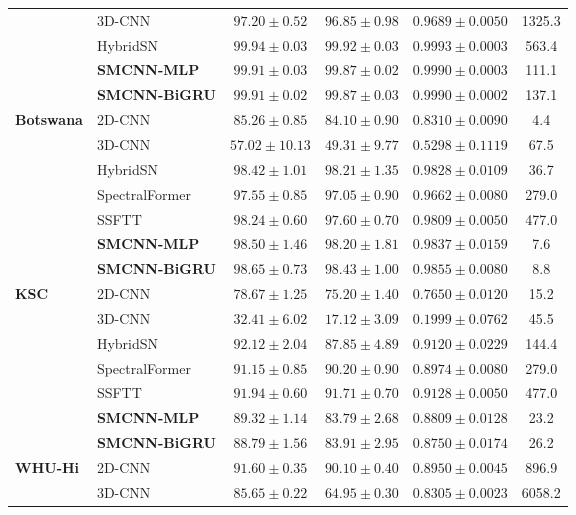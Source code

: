 \documentclass[pdflatex,sn-mathphys-num,iicol]{sn-jnl}
\begin{document}
\begin{table}[htbp]
\begin{tabular}{llcccc}
& 3D-CNN & $97.20 \pm 0.52$ & $96.85 \pm 0.98$ & $0.9689 \pm 0.0050$ & 1325.3 \\
& HybridSN & $99.94 \pm 0.03$ & $99.92 \pm 0.03$ & $0.9993 \pm 0.0003$ & 563.4 \\
& \textbf{SMCNN-MLP} & $99.91 \pm 0.03$ & $99.87 \pm 0.02$ & $0.9990 \pm 0.0003$ & 111.1 \\
& \textbf{SMCNN-BiGRU} & \textbf{$99.91 \pm 0.02$} & \textbf{$99.87 \pm 0.03$} & \textbf{$0.9990 \pm 0.0002$} & 137.1 \\
\midrule
\multirow{5}{*}{\textbf{Botswana}} 
 & 2D-CNN & $85.26 \pm 0.85$ & $84.10 \pm 0.90$ & $0.8310 \pm 0.0090$ & 4.4 \\
 & 3D-CNN & $57.02 \pm 10.13$ & $49.31 \pm 9.77$ & $0.5298 \pm 0.1119$ & 67.5 \\
 & HybridSN & $98.42 \pm 1.01$ & $98.21 \pm 1.35$ & $0.9828 \pm 0.0109$ & 36.7 \\
 & SpectralFormer & $97.55 \pm 0.85$ & $97.05 \pm 0.90$ & $0.9662 \pm 0.0080$ & 279.0 \\
 & SSFTT & $98.24 \pm 0.60$ & $97.60 \pm 0.70$ & $0.9809 \pm 0.0050$ & 477.0 \\
 & \textbf{SMCNN-MLP} & $98.50 \pm 1.46$ & $98.20 \pm 1.81$ & $0.9837 \pm 0.0159$ & 7.6 \\
 & \textbf{SMCNN-BiGRU} & \textbf{$98.65 \pm 0.73$} & \textbf{$98.43 \pm 1.00$} & \textbf{$0.9855 \pm 0.0080$} & 8.8 \\
\midrule
\multirow{5}{*}{\textbf{KSC}} 
 & 2D-CNN & $78.67 \pm 1.25$ & $75.20 \pm 1.40$ & $0.7650 \pm 0.0120$ & 15.2 \\
 & 3D-CNN & $32.41 \pm 6.02$ & $17.12 \pm 3.09$ & $0.1999 \pm 0.0762$ & 45.5 \\
 & HybridSN & $92.12 \pm 2.04$ & $87.85 \pm 4.89$ & $0.9120 \pm 0.0229$ & 144.4 \\
 & SpectralFormer & $91.15 \pm 0.85$ & $90.20 \pm 0.90$ & $0.8974 \pm 0.0080$ & 279.0 \\
 & SSFTT & $91.94 \pm 0.60$ & $91.71 \pm 0.70$ & $0.9128 \pm 0.0050$ & 477.0 \\
 & \textbf{SMCNN-MLP} & $89.32 \pm 1.14$ & $83.79 \pm 2.68$ & $0.8809 \pm 0.0128$ & 23.2 \\
 & \textbf{SMCNN-BiGRU} & \textbf{$88.79 \pm 1.56$} & \textbf{$83.91 \pm 2.95$} & \textbf{$0.8750 \pm 0.0174$} & 26.2 \\
\midrule
\multirow{5}{*}{\textbf{WHU-Hi}} 
 & 2D-CNN & $91.60 \pm 0.35$ & $90.10 \pm 0.40$ & $0.8950 \pm 0.0045$ & 896.9 \\
 & 3D-CNN & $85.65 \pm 0.22$ & $64.95 \pm 0.30$ & $0.8305 \pm 0.0023$ & 6058.2 \\

\end{tabular}
\end{table}
\end{document}
